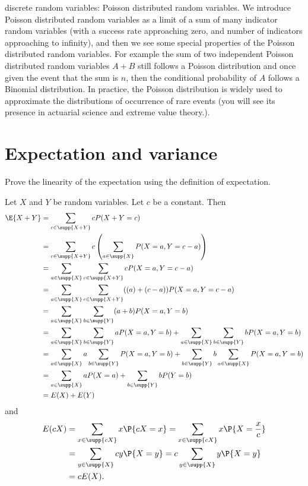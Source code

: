 discrete random variables: Poisson distributed random variables. We introduce Poisson distributed random variables as
a limit of a sum of many indicator random variables (with a success rate approaching zero, and number of indicators
approaching to infinity), and then we see some special properties of the Poisson distributed random variables. For example
the sum of two independent Poisson distributed random variables $A + B$ still follows a Poisson distribution and once given
the event that the sum is $n$, then the conditional probability of $A$ follows a Binomial distribution. In practice, the Poisson distribution is widely used
to approximate the distributions of occurrence of rare events (you will see its presence in actuarial science and extreme value
theory.).

\section{Expectation and variance}
\label{sec:section-4.1}

\begin{exercise}
	Prove the linearity of the expectation using the definition of expectation.
	\begin{solution}
		Let $X$ and $Y$ be random variables. Let $c$ be a constant. Then
		\begin{align*}
			\E{X+Y} & = \sum_{c\in \supp{X+Y}} c P(X+Y=c) \\
			&= \sum_{c\in \supp{X+Y}} c\left(\sum_{a \in \supp{X}} P(X=a, Y=c-a)\right) \\
			&= \sum_{a \in \supp{X}} \sum_{c\in \supp{X+Y}} c P(X=a, Y=c-a) \\
			&= \sum_{a \in \supp{X}} \sum_{c\in \supp{X+Y}}((a)+(c-a)) P(X=a, Y=c-a) \\
			&= \sum_{a \in \supp{X}} \sum_{b \in \supp{Y}}(a+b) P(X=a, Y=b) \\
			&= \sum_{a \in \supp{X}} \sum_{b \in \supp{Y}} a P(X=a, Y=b)+\sum_{a \in \supp{X}} \sum_{b \in \supp{Y}} b P(X=a, Y=b) \\
			&= \sum_{a \in \supp{X}} a \sum_{b \in \supp{Y}} P(X=a, Y=b)+\sum_{b \in \supp{Y}} b \sum_{a \in \supp{X}} P(X=a, Y=b) \\
			&= \sum_{a \in \supp{X}} a P(X=a)+\sum_{b \in \supp{Y}} b P(Y=b) \\
			&= E(X)+E(Y)
		\end{align*}
		and
		\begin{align*}
			E(cX) & = \sum_{x \in \supp{cX}} x \P{cX = x} = \sum_{x\in \supp{cX}} x \P{X = \frac{x}{c}} \\
			& = \sum_{y \in \supp{X}} cy \P{X = y } = c\sum_{y \in \supp{X}} y \P{X = y} \\
			& = c E(X).
		\end{align*}
	\end{solution}
\end{exercise}


